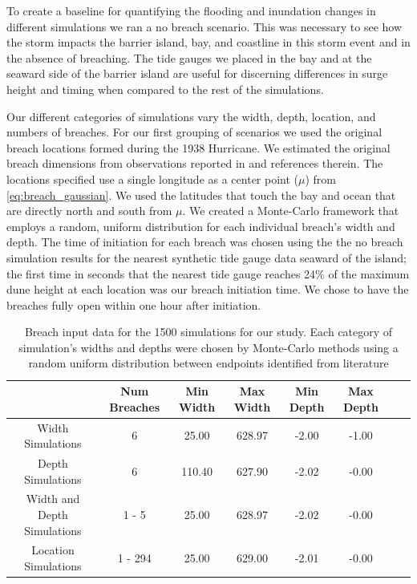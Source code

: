 \documentclass{coastal_paper}
\begin{document}
To create a baseline for quantifying the flooding and inundation changes in different simulations we ran a no breach scenario. This was necessary to see how the storm impacts the barrier island, bay, and coastline in this storm event and in the absence of breaching. The tide gauges we placed in the bay and at the seaward side of the barrier island are useful for discerning differences in surge height and timing when compared to the rest of the simulations.

Our different categories of simulations vary the width, depth, location, and numbers of breaches. For our first grouping of scenarios we used the original breach locations formed during the 1938 Hurricane. We estimated the original breach dimensions from observations reported in \citet{Canizares2008} and references therein. The locations specified use a single longitude as a center point ($\mu$) from \ref{eq:breach_gaussian}. We used the latitudes that touch the bay and ocean that are directly north and south from $\mu$. We created a Monte-Carlo framework that employs a random, uniform distribution for each individual breach's width and depth. The time of initiation for each breach was chosen using the the no breach simulation results for the nearest synthetic tide gauge data seaward of the island; the first time in seconds that the nearest tide gauge reaches 24\% of the maximum dune height at each location was our breach initiation time. We chose to have the breaches fully open within one hour after initiation.

\begin{table}
\begin{tabular}{cccccccc}
\toprule
{} & Num Breaches & Min Width & Max Width & Min Depth & Max Depth \\
\midrule
Width Simulations         &            6 &     25.00 &    628.97 &     -2.00 &     -1.00 \\
Depth Simulations         &            6 &    110.40 &    627.90 &     -2.02 &     -0.00 \\
Width and Depth Simulations &        1 - 5 &     25.00 &    628.97 &     -2.02 &     -0.00 \\
Location Simulations    &      1 - 294 &     25.00 &    629.00 &     -2.01 &     -0.00 \\
\bottomrule
\end{tabular}
\caption{Breach input data for the 1500 simulations for our study. Each category of simulation's widths and depths were chosen by Monte-Carlo methods using a random uniform distribution between endpoints identified from literature}
\label{table:1}
\end{table}
\end{document}
